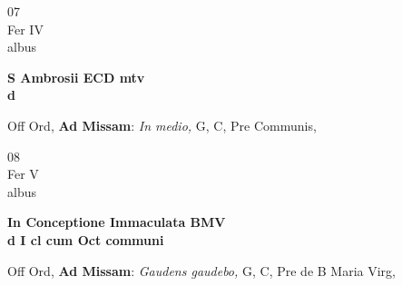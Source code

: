 \documentclass[10pt, openany]{book}
\begin{document}
        \begin{center}
            \begin{minipage}{3.5in}
                \vspace{2em}
                \begin{minipage}{0.5in}
                    {\Huge 07} \\
                    {\normalsize Fer IV} \\
                    {\normalsize albus}
                \end{minipage}
                \begin{minipage}{3.0in}
                    \textbf{ \large S Ambrosii ECD mtv \\
                    \textnormal{\normalsize d}} \\ 
                \end{minipage}
                \begin{justify}Off Ord, \textbf{Ad Missam}: \textit{In medio,} G, C, Pre Communis,   
                \end{justify}
            \end{minipage}
        \end{center}
    
        \begin{center}
            \begin{minipage}{3.5in}
                \vspace{2em}
                \begin{minipage}{0.5in}
                    {\Huge 08} \\
                    {\normalsize Fer V} \\
                    {\normalsize albus}
                \end{minipage}
                \begin{minipage}{3.0in}
                    \textbf{ \large In Conceptione Immaculata BMV \\
                    \textnormal{\normalsize d I cl cum Oct communi}} \\ 
                \end{minipage}
                \begin{justify}Off Ord, \textbf{Ad Missam}: \textit{Gaudens gaudebo,} G, C, Pre de B Maria Virg,   
                \end{justify}
            \end{minipage}
        \end{center}
    
\end{document}
